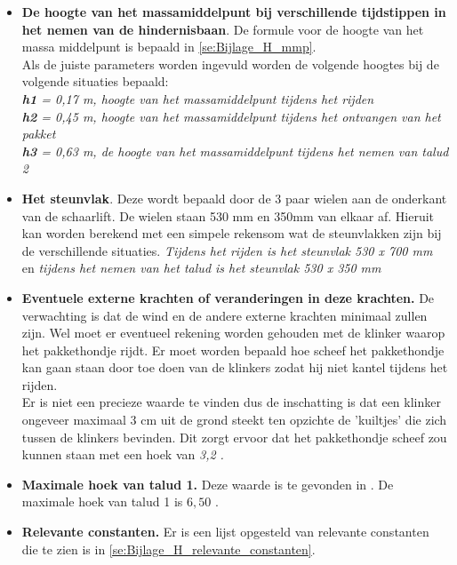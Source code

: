 \begin{itemize}

    \item \textbf{De hoogte van het massamiddelpunt bij verschillende tijdstippen in het nemen van de hindernisbaan}. De formule voor de hoogte van het massa middelpunt is bepaald in \cref{se:Bijlage_H_mmp}.\\
    Als de juiste parameters worden ingevuld worden de volgende hoogtes bij de volgende situaties bepaald:\\
    \textit{\textbf{h1} = 0,17 m,  hoogte van het massamiddelpunt tijdens het rijden\\
    \textbf{h2} = 0,45 m,  hoogte van het massamiddelpunt tijdens het ontvangen van het pakket \\
    \textbf{h3} = 0,63 m, de hoogte van het massamiddelpunt tijdens het nemen van talud 2\\}

    \item \textbf{Het steunvlak}. Deze wordt bepaald door de 3 paar wielen aan de onderkant van de schaarlift. De wielen staan 530 mm en 350mm van elkaar af. Hieruit kan worden berekend met een simpele rekensom wat de steunvlakken zijn bij de verschillende situaties. \textit{Tijdens het rijden is het steunvlak 530 x 700 mm} en \textit{tijdens het nemen van het talud is het steunvlak 530 x 350 mm}
    
    \item \textbf{Eventuele externe krachten of veranderingen in deze krachten.} De verwachting is dat de wind en de andere externe krachten minimaal zullen zijn. Wel moet er eventueel rekening worden gehouden met de klinker waarop het pakkethondje rijdt. Er moet worden bepaald hoe scheef het pakkethondje kan gaan staan door toe doen van de klinkers zodat hij niet kantel tijdens het rijden.\\
    Er is niet een precieze waarde te vinden dus de inschatting is dat een klinker ongeveer maximaal 3 cm uit de grond steekt ten opzichte de 'kuiltjes' die zich tussen de klinkers bevinden. Dit zorgt ervoor dat het pakkethondje scheef zou kunnen staan met een hoek van \textit{3,2 \textdegree.}\\
    
    \item \textbf{Maximale hoek van talud 1.} Deze waarde is te gevonden in \cite{beek_2020_wedstrijdregelement}. De maximale hoek van talud 1 is $6,50$ \textdegree.

    \item \textbf{Relevante constanten.} Er is een lijst opgesteld van relevante constanten die te zien is in \cref{se:Bijlage_H_relevante_constanten}.
    
\end{itemize}
\vspace{\baselineskip}

